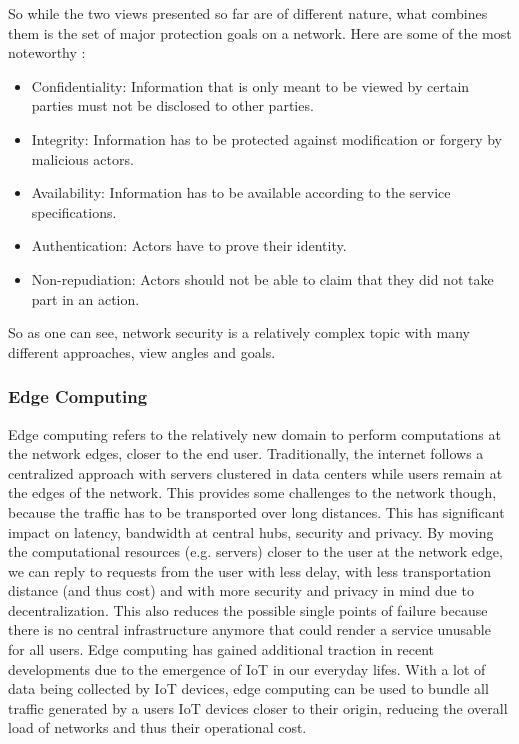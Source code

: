 \documentclass{article}
\begin{document}
So while the two views presented so far are of different nature, what combines them is the set of major protection goals on a network. Here are some of the most noteworthy \cite{goals}:
\begin{itemize}
    \item Confidentiality: Information that is only meant to be viewed by certain parties must not be disclosed to other parties.
    \item Integrity: Information has to be protected against modification or forgery by malicious actors.
    \item Availability: Information has to be available according to the service specifications.
    \item Authentication: Actors have to prove their identity.
    \item Non-repudiation: Actors should not be able to claim that they did not take part in an action.
\end{itemize}
So as one can see, network security is a relatively complex topic with many different approaches, view angles and goals.

\subsubsection{Edge Computing}
Edge computing \cite{edgecomputing} refers to the relatively new domain to perform computations at the network edges, closer to the end user. Traditionally, the internet follows a centralized approach with servers clustered in data centers while users remain at the edges of the network. This provides some challenges to the network though, because the traffic has to be transported over long distances. This has significant impact on latency, bandwidth at central hubs, security and privacy. By moving the computational resources (e.g. servers) closer to the user at the network edge, we can reply to requests from the user with less delay, with less transportation distance (and thus cost) and with more security and privacy in mind due to decentralization. This also reduces the possible single points of failure because there is no central infrastructure anymore that could render a service unusable for all users. Edge computing has gained additional traction in recent developments due to the emergence of IoT in our everyday lifes. With a lot of data being collected by IoT devices, edge computing can be used to bundle all traffic generated by a users IoT devices closer to their origin, reducing the overall load of networks and thus their operational cost.
\end{document}
